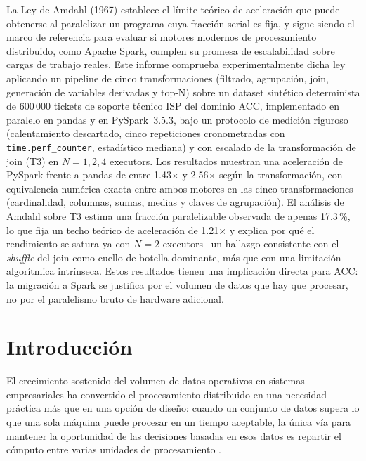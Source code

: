 \documentclass[11pt,a4paper]{article}
\begin{document}
La Ley de Amdahl (1967) establece el l\'imite te\'orico de aceleraci\'on que
puede obtenerse al paralelizar un programa cuya fracci\'on serial es fija, y
sigue siendo el marco de referencia para evaluar si motores modernos de
procesamiento distribuido, como Apache Spark, cumplen su promesa de
escalabilidad sobre cargas de trabajo reales. Este informe comprueba
experimentalmente dicha ley aplicando un pipeline de cinco transformaciones
(filtrado, agrupaci\'on, join, generaci\'on de variables derivadas y top-N)
sobre un dataset sint\'etico determinista de 600\,000 tickets de soporte
t\'ecnico ISP del dominio ACC, implementado en paralelo en pandas y en
PySpark~3.5.3, bajo un protocolo de medici\'on riguroso (calentamiento
descartado, cinco repeticiones cronometradas con \texttt{time.perf\_counter},
estad\'istico mediana) y con escalado de la transformaci\'on de join (T3) en
$N=1,2,4$ executors. Los resultados muestran una aceleraci\'on de PySpark
frente a pandas de entre 1.43$\times$ y 2.56$\times$ seg\'un la
transformaci\'on, con equivalencia num\'erica exacta entre ambos motores en
las cinco transformaciones (cardinalidad, columnas, sumas, medias y claves de
agrupaci\'on). El an\'alisis de Amdahl sobre T3 estima una fracci\'on
paralelizable observada de apenas 17.3\,\%, lo que fija un techo te\'orico de
aceleraci\'on de 1.21$\times$ y explica por qu\'e el rendimiento se satura ya
con $N=2$ executors --un hallazgo consistente con el \emph{shuffle} del join
como cuello de botella dominante, m\'as que con una limitaci\'on
algor\'itmica intr\'inseca. Estos resultados tienen una implicaci\'on directa
para ACC: la migraci\'on a Spark se justifica por el volumen de datos que hay
que procesar, no por el paralelismo bruto de hardware adicional.

\newpage

\section{Introducci\'on}

El crecimiento sostenido del volumen de datos operativos en sistemas
empresariales ha convertido el procesamiento distribuido en una necesidad
pr\'actica m\'as que en una opci\'on de dise\~no: cuando un conjunto de datos
supera lo que una sola m\'aquina puede procesar en un tiempo aceptable, la
\'unica v\'ia para mantener la oportunidad de las decisiones basadas en esos
datos es repartir el c\'omputo entre varias unidades de procesamiento
\cite{dean2008,zaharia2016}.
\end{document}
